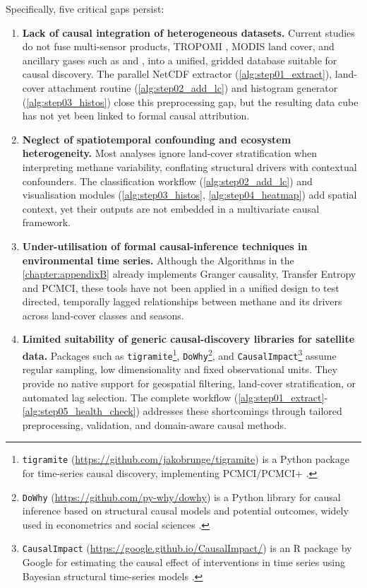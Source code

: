 Specifically, five critical gaps persist:

\begin{enumerate}
    \item \textbf{Lack of causal integration of heterogeneous datasets.}  
    Current studies do not fuse multi-sensor products, TROPOMI , MODIS land cover, and ancillary gases such as  and , into a unified, gridded database suitable for causal discovery.  
    The parallel NetCDF extractor (\autoref{alg:step01_extract}), land-cover attachment routine (\autoref{alg:step02_add_lc}) and histogram generator (\autoref{alg:step03_histos}) close this preprocessing gap, but the resulting data cube has not yet been linked to formal causal attribution.
    
    \item \textbf{Neglect of spatiotemporal confounding and ecosystem heterogeneity.}  
    Most analyses ignore land-cover stratification when interpreting methane variability, conflating structural drivers with contextual confounders.  
    The classification workflow (\autoref{alg:step02_add_lc}) and visualisation modules (\autoref{alg:step03_histos}, \autoref{alg:step04_heatmap}) add spatial context, yet their outputs are not embedded in a multivariate causal framework.
    
    \item \textbf{Under-utilisation of formal causal-inference techniques in environmental time series.}  
    Although the Algorithms in the \ref{chapter:appendixB} already implements Granger causality, Transfer Entropy and PCMCI, these tools have not been applied in a unified design to test directed, temporally lagged relationships between methane and its drivers across land-cover classes and seasons.
    
    \item \textbf{Limited suitability of generic causal-discovery libraries for satellite data.}  
    Packages such as \texttt{tigramite}\footnote{\texttt{tigramite} (\url{https://github.com/jakobrunge/tigramite}) is a Python package for time-series causal discovery, implementing PCMCI/PCMCI+ \cite{Runge2019}.}, 
    \texttt{DoWhy}\footnote{\texttt{DoWhy} (\url{https://github.com/py-why/dowhy}) is a Python library for causal inference based on structural causal models and potential outcomes, widely used in econometrics and social sciences \cite{angell_estimating_2021}.}, 
    and \texttt{CausalImpact}\footnote{\texttt{CausalImpact} (\url{https://google.github.io/CausalImpact/}) is an R package by Google for estimating the causal effect of interventions in time series using Bayesian structural time-series models \cite{varian_big_2014}.} 
    assume regular sampling, low dimensionality and fixed observational units.  They provide no native support for geospatial filtering, land-cover stratification, or automated lag selection.  
    The complete workflow (\autoref{alg:step01_extract}-\autoref{alg:step05_health_check}) addresses these shortcomings through tailored preprocessing, validation, and domain-aware causal methods.
    

\end{enumerate}
